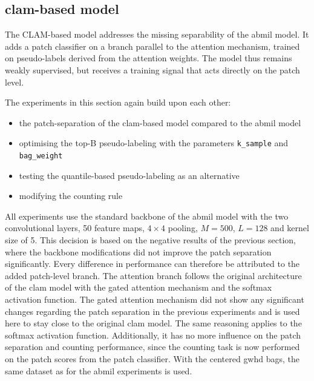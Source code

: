 \documentclass[12pt,parskip = half, DIV=classic,listof=totoc]{scrartcl}
\begin{document}
		\subsection{\acs*{clam}-based model}\label{sec:clam_results}

			The CLAM-based model addresses the missing separability of the \ac{abmil} model. It adds a patch classifier on
			a branch parallel to the attention mechanism, trained on pseudo-labels derived from
			the attention weights. The model thus remains weakly supervised, but receives a
			training signal that acts directly on the patch level.

			The experiments in this section again build upon each other:
			\begin{itemize}
				\item the patch-separation of the \acs*{clam}-based model compared to the \ac{abmil} model \\
				\item optimising the top-B pseudo-labeling with the parameters \texttt{k\_sample} and \texttt{bag\_weight} \\
				\item testing the quantile-based pseudo-labeling as an alternative \\
				\item modifying the counting rule \\
			\end{itemize}

			All experiments use the standard backbone of the \ac{abmil} model with the two convolutional layers, 50 feature maps, $4\times4$ pooling,
			$M=500$, $L=128$ and kernel size of 5. This decision is based on the negative results of the previous section, where the 
			backbone modifications did not improve the patch separation significantly. Every difference in performance can therefore be attributed to the
			added patch-level branch. The attention branch follows the original architecture of the \ac{clam} model with the 
			gated attention mechanism and the softmax activation function. The gated attention mechanism did not show any significant changes regarding the 
			patch separation in the previous experiments and is used here to stay close to the original \ac{clam} model. The same reasoning applies to the softmax 
			activation function. Additionally, it has no more influence on the patch separation and counting performance, since the 
			counting task is now performed on the patch scores from the patch classifier. With the centered \ac{gwhd} bags,
			the same dataset as for the \ac{abmil} experiments is used.
\end{document}
